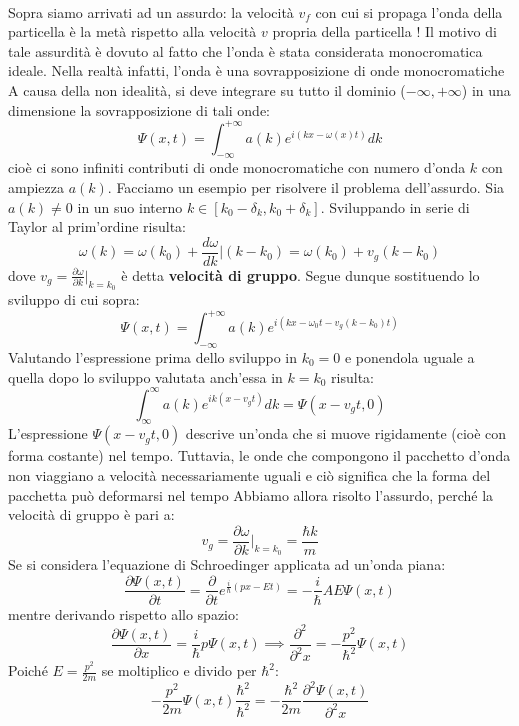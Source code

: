 \documentclass{book}
\begin{document}
        \paragraph{}
            Sopra siamo arrivati ad un assurdo: la velocità $v_{f}$ con cui si propaga l'onda della particella è la metà rispetto alla velocità $v$ propria della particella ! Il motivo di tale assurdità è dovuto al fatto che l'onda è stata considerata monocromatica ideale. Nella realtà infatti, l'onda è una sovrapposizione di onde monocromatiche
            A causa della non idealità, si deve integrare su tutto il dominio ($- \infty, + \infty$) in una dimensione la sovrapposizione di tali onde:
            $$\Psi (x,t) = \int_{-\infty} ^{+\infty} a(k)e^{i(kx-\omega (x) t)} dk$$
            cioè ci sono infiniti contributi di onde monocromatiche con numero d'onda $k$ con ampiezza $a(k)$.
            Facciamo un esempio per risolvere il problema dell'assurdo. Sia $a(k) \neq 0$ in un suo interno $k \in [k_{0}-\delta_{k}, k_{0}+\delta_{k}]$. Sviluppando in serie di Taylor al prim'ordine risulta:
            $$\omega(k) = \omega(k_{0}) + \frac{d\omega}{dk} |(k-k_{0}) = \omega(k_{0})+v_{g}(k-k_{0})$$
            dove $v_{g} = \displaystyle \frac{\partial \omega}{\partial k}|_{k=k_{0}}$ è detta \textbf{velocità di gruppo}. Segue dunque sostituendo lo sviluppo di cui sopra:
            $$\Psi (x,t) = \int_{- \infty} ^{+\infty} a(k)e^{i(kx- \omega_{0} t - v_{g}(k-k_{0})t)}$$
            Valutando l'espressione prima dello sviluppo in $k_{0}=0$ e ponendola uguale a quella dopo lo sviluppo valutata anch'essa in $k=k_{0}$ risulta:
            $$\int_{\infty} ^{\infty} a(k)e^{ik(x-v_{g}t)}dk = \Psi (x-v_{g}t, 0)$$
            L'espressione $\Psi (x-v_{g}t, 0)$ descrive un'onda che si muove rigidamente (cioè con forma costante) nel tempo.
            Tuttavia, le onde che compongono il pacchetto d'onda non viaggiano a velocità necessariamente uguali e ciò significa che la forma del pacchetta può deformarsi nel tempo
            Abbiamo allora risolto l'assurdo, perché la velocità di gruppo è pari a:
            $$v_{g} = \frac{\partial \omega}{\partial k}|_{k = k_{0}} = \frac{\hbar k}{m}$$
            Se si considera l'equazione di Schroedinger applicata ad un'onda piana:
            $$\frac{\partial \Psi (x,t)}{\partial t} = \frac{\partial}{\partial t} e^{\frac{i}{\hbar} (px-Et)} = -\frac{i}{\hbar} AE \Psi (x, t)$$
            mentre derivando rispetto allo spazio:
            $$\frac{\partial \Psi (x,t)}{\partial x} = \frac{i}{\hbar} p \Psi (x,t) \implies \frac{\partial ^{2}}{\partial ^{2}x} = -\frac{p^{2}}{\hbar ^{2}} \Psi (x,t)$$
            Poiché $E = \frac{p^{2}}{2m}$ se moltiplico e divido per $\hbar ^{2}$:
            $$- \frac{p^{2}}{2m} \Psi(x,t) \frac{\hbar ^{2}}{\hbar ^{2}} = - \frac{\hbar ^{2}}{2m} \frac{\partial ^{2} \Psi(x,t)}{\partial ^{2}x} $$
\end{document}
